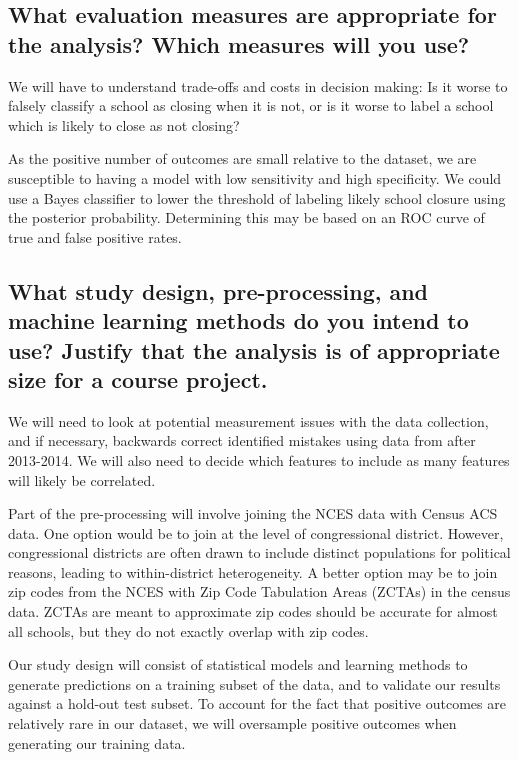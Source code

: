 \documentclass[twoside,11pt]{article}
\begin{document}
\subsection{What evaluation measures are appropriate for the analysis? Which measures will you use?}

We will have to understand trade-offs and costs in decision making:  Is it worse to falsely classify a school as closing when it is not, or is it worse to label a school which is likely to close as not closing?

As the positive number of outcomes are small relative to the dataset, we are susceptible to having a model with low sensitivity and high specificity.  We could use a Bayes classifier to lower the threshold of labeling likely school closure using the posterior probability.  Determining this may be based on an ROC curve of true and false positive rates.  


\subsection{What study design, pre-processing, and machine learning methods do you intend to use? Justify that the analysis is of appropriate size for a course project.}

We will need to look at potential measurement issues with the data collection, and if necessary, backwards correct identified mistakes using data from after 2013-2014. We will also need to decide which features to include as many features will likely be correlated.

Part of the pre-processing will involve joining the NCES data with Census ACS data. One option would be to join at the level of congressional district. However, congressional districts are often drawn to include distinct populations for political reasons, leading to within-district heterogeneity. A better option may be to join zip codes from the NCES with Zip Code Tabulation Areas (ZCTAs) in the census data. ZCTAs are meant to approximate zip codes should be accurate for almost all schools, but they do not exactly overlap with zip codes. 

Our study design will consist of statistical models and learning methods to generate predictions on a training subset of the data, and to validate our results against a hold-out test subset. To account for the fact that positive outcomes are relatively rare in our dataset, we will oversample positive outcomes when generating our training data.
\end{document}
